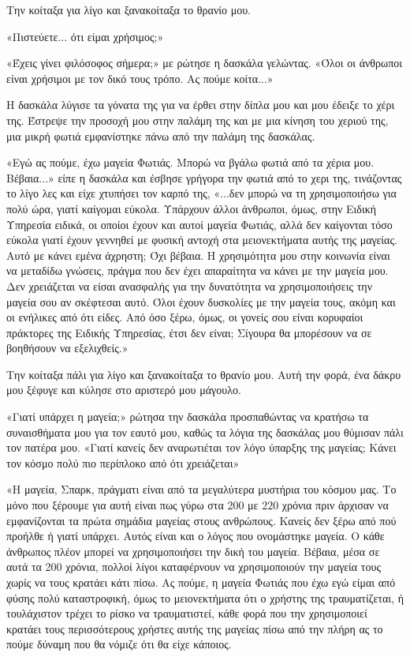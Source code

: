 \documentclass[12pt,twoside, openany]{book}
\begin{document}
Την κοίταξα για λίγο και ξανακοίταξα το θρανίο μου.

«Πιστεύετε... ότι είμαι χρήσιμος;»

«Έχεις γίνει φιλόσοφος σήμερα;» με ρώτησε η δασκάλα γελώντας. «Όλοι οι άνθρωποι είναι χρήσιμοι με τον δικό τους τρόπο. Ας πούμε κοίτα...»

Η δασκάλα λύγισε τα γόνατα της για να έρθει στην δίπλα μου και μου έδειξε το χέρι της. Έστρεψε την προσοχή μου στην παλάμη της και με μια κίνηση του χεριού της, μια μικρή φωτιά εμφανίστηκε πάνω από την παλάμη της δασκάλας.

«Εγώ ας πούμε, έχω μαγεία Φωτιάς. Μπορώ να βγάλω φωτιά από τα χέρια μου. Βέβαια...» είπε η δασκάλα και έσβησε γρήγορα την φωτιά από το χερι της, τινάζοντας το λίγο λες και είχε χτυπήσει τον καρπό της, «...δεν μπορώ να τη χρησιμοποιήσω για πολύ ώρα, γιατί καίγομαι εύκολα. Υπάρχουν άλλοι άνθρωποι, όμως, στην Ειδική Υπηρεσία ειδικά, οι οποίοι έχουν και αυτοί μαγεία Φωτιάς, αλλά δεν καίγονται τόσο εύκολα γιατί έχουν γεννηθεί με φυσική αντοχή στα μειονεκτήματα αυτής της μαγείας. Αυτό με κάνει εμένα άχρηστη; Όχι βέβαια. Η χρησιμότητα μου στην κοινωνία είναι να μεταδίδω γνώσεις, πράγμα που δεν έχει απαραίτητα να κάνει με την μαγεία μου. Δεν χρειάζεται να είσαι ανασφαλής για την δυνατότητα να χρησιμοποιήσεις την μαγεία σου αν σκέφτεσαι αυτό. Όλοι έχουν δυσκολίες με την μαγεία τους, ακόμη και οι ενήλικες από ότι είδες. Από όσο ξέρω, όμως, οι γονείς σου είναι κορυφαίοι πράκτορες της Ειδικής Υπηρεσίας, έτσι δεν είναι; Σίγουρα θα μπορέσουν να σε βοηθήσουν να εξελιχθείς.»

Την κοίταξα πάλι για λίγο και ξανακοίταξα το θρανίο μου. Αυτή την φορά, ένα δάκρυ μου ξέφυγε και κύλησε στο αριστερό μου μάγουλο.

«Γιατί υπάρχει η μαγεία;» ρώτησα την δασκάλα προσπαθώντας να κρατήσω τα συναισθήματα μου για τον εαυτό μου, καθώς τα λόγια της δασκάλας μου θύμισαν πάλι τον πατέρα μου. «Γιατί κανείς δεν αναρωτιέται τον λόγο ύπαρξης της μαγείας; Κάνει τον κόσμο πολύ πιο περίπλοκο από ότι χρειάζεται»

«Η μαγεία, Σπαρκ, πράγματι είναι από τα μεγαλύτερα μυστήρια του κόσμου μας. Το μόνο που ξέρουμε για αυτή είναι πως γύρω στα 200 με 220 χρόνια πριν άρχισαν να εμφανίζονται τα πρώτα σημάδια μαγείας στους ανθρώπους. Κανείς δεν ξέρω από πού προήλθε ή γιατί υπάρχει. Αυτός είναι και ο λόγος που ονομάστηκε μαγεία. Ο κάθε άνθρωπος πλέον μπορεί να χρησιμοποιήσει την δική του μαγεία. Βέβαια, μέσα σε αυτά τα 200 χρόνια, πολλοί λίγοι καταφέρνουν να χρησιμοποιούν την μαγεία τους χωρίς να τους κρατάει κάτι πίσω. Ας πούμε, η μαγεία Φωτιάς που έχω εγώ είμαι από φύσης πολύ καταστροφική, όμως το μειονεκτήματα ότι ο χρήστης της τραυματίζεται, ή τουλάχιστον τρέχει το ρίσκο να τραυματιστεί, κάθε φορά που την χρησιμοποιεί κρατάει τους περισσότερους χρήστες αυτής της μαγείας πίσω από την πλήρη ας το πούμε δύναμη που θα νόμιζε ότι θα είχε κάποιος. 
\end{document}

